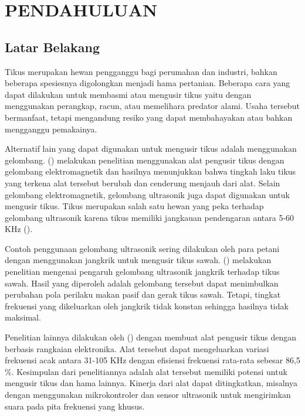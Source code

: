 \section*{PENDAHULUAN} %
\subsection*{Latar Belakang}
Tikus merupakan hewan pengganggu bagi perumahan dan industri, bahkan beberapa spesiesnya digolongkan menjadi hama pertanian. Beberapa cara yang dapat dilakukan untuk membasmi atau mengusir tikus yaitu dengan menggunakan perangkap, racun, atau memelihara predator alami. Usaha tersebut bermanfaat, tetapi mengandung resiko yang dapat membahayakan atau bahkan mengganggu pemakainya.

Alternatif lain yang dapat digunakan untuk mengusir tikus adalah menggunakan gelombang. \citeauthor{BAROCH2002} (\cite*{BAROCH2002})  melakukan penelitian menggunakan alat pengusir tikus dengan gelombang elektromagnetik dan hasilnya menunjukkan bahwa tingkah laku tikus yang terkena alat tersebut berubah dan cenderung menjauh dari alat. Selain gelombang elektromagnetik, gelombang ultrasonik juga dapat digunakan untuk mengusir tikus. Tikus merupakan salah satu hewan yang peka terhadap gelombang ultrasonik karena tikus memiliki jangkauan pendengaran antara 5-60 KHz (\cite{HEFFNER2007}).

Contoh penggunaan gelombang ultrasonik sering dilakukan oleh para petani dengan menggunakan jangkrik untuk mengusir tikus sawah. \citeauthor{TITO2011} (\cite*{TITO2011}) melakukan penelitian mengenai pengaruh gelombang ultrasonik jangkrik terhadap tikus sawah. Hasil yang diperoleh adalah gelombang tersebut dapat menimbulkan perubahan pola perilaku makan pasif dan gerak tikus sawah. Tetapi, tingkat frekuensi yang dikeluarkan oleh jangkrik tidak konstan sehingga hasilnya tidak maksimal.

Penelitian lainnya dilakukan oleh \citeauthor{SIMEON2013} (\cite*{SIMEON2013}) dengan membuat alat pengusir tikus dengan berbasis rangkaian elektronika. Alat tersebut dapat mengeluarkan variasi frekuensi acak antara 31-105 KHz dengan efisiensi frekuensi rata-rata sebesar 86,5$\%$. Kesimpulan dari penelitiannya adalah alat tersebut memiliki potensi untuk mengusir tikus dan hama lainnya. Kinerja dari alat dapat ditingkatkan, misalnya dengan menggunakan mikrokontroler dan sensor ultrasonik untuk mengirimkan suara pada pita frekuensi yang khusus.

